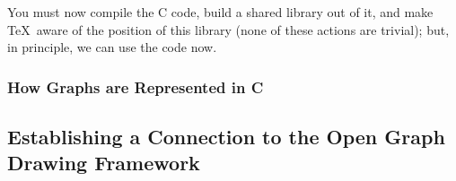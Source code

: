 You must now compile the C code, build a shared library out of it, and
make \TeX\ aware of the position of this library (none of these
actions are trivial); but, in principle, we can use the code now.


\subsubsection{How Graphs are Represented in C}

\label{section-interfacetoc}




\subsection{Establishing a Connection to the Open Graph Drawing Framework}

